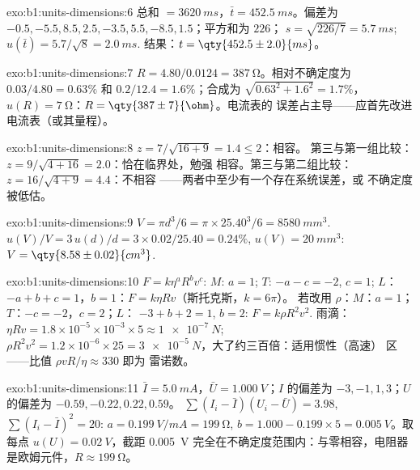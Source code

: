 \begin{solution}{exo:b1:units-dimensions:6}
总和 $= \qty{3620}{ms}$，$\bar t = \qty{452.5}{ms}$。偏差为
$-0.5, -5.5, 8.5, 2.5, -3.5, 5.5, -8.5, 1.5$；平方和为 $226$；
$s = \sqrt{226/7} = \qty{5.7}{ms}$; $u(\bar t) = 5.7/\sqrt8 = \qty{2.0}{ms}$.
结果：$t = \qty{452.5\pm2.0}{ms}$。
\end{solution}

\begin{solution}{exo:b1:units-dimensions:7}
$R = 4.80/0.0124 = \qty{387}{\ohm}$。相对不确定度为 $0.03/4.80 =
0.63\%$ 和 $0.2/12.4 = 1.6\%$；合成为 $\sqrt{0.63^2 + 1.6^2} = 1.7\%$，
$u(R) = \qty{7}{\ohm}$：$R = \qty{387\pm7}{\ohm}$。电流表的
误差占主导——应首先改进电流表（或其量程）。
\end{solution}

\begin{solution}{exo:b1:units-dimensions:8}
$z = 7/\sqrt{16 + 9} = 1.4 \leq 2$：相容。
第三与第一组比较：$z = 9/\sqrt{4 + 16} = 2.0$：恰在临界处，勉强
相容。第三与第二组比较：$z = 16/\sqrt{4 + 9} = 4.4$：不相容
——两者中至少有一个存在系统误差，或
不确定度被低估。
\end{solution}

\begin{solution}{exo:b1:units-dimensions:9}
$V = \pi d^3/6 = \pi \times 25.40^3/6 = \qty{8580}{mm^3}$.
$u(V)/V = 3\,u(d)/d = 3 \times 0.02/25.40 = 0.24\%$,
$u(V) = \qty{20}{mm^3}$: $V = \qty{8.58\pm0.02}{cm^3}$.
\end{solution}

\begin{solution}{exo:b1:units-dimensions:10}
$F = k\eta^a R^b v^c$: $M$: $a = 1$; $T$: $-a - c = -2$, $c = 1$;
$L$：$-a + b + c = 1$，$b = 1$：$F = k\eta R v$（斯托克斯，$k = 6\pi$）。
若改用 $\rho$：$M$：$a = 1$；$T$：$-c = -2$，$c = 2$；$L$：
$-3 + b + 2 = 1$, $b = 2$: $F = k\rho R^2 v^2$.
雨滴：$\eta R v = 1.8\times10^{-5} \times 10^{-3} \times 5 \approx
\qty{1e-7}{N}$; $\rho R^2 v^2 = 1.2 \times 10^{-6} \times 25 =
\qty{3e-5}{N}$，大了约三百倍：适用惯性（高速）
区——比值 $\rho v R/\eta \approx 330$ 即为
雷诺数。
\end{solution}

\begin{solution}{exo:b1:units-dimensions:11}
$\bar I = \qty{5.0}{mA}$，$\bar U = \qty{1.000}{V}$；$I$ 的偏差为
$-3, -1, 1, 3$；$U$ 的偏差为 $-0.59, -0.22, 0.22, 0.59$。
$\sum (I_i - \bar I)(U_i - \bar U) = 3.98$, $\sum (I_i - \bar I)^2 = 20$:
$a = \qty{0.199}{V/mA} = \qty{199}{\ohm}$, $b = 1.000 - 0.199 \times 5 =
\qty{0.005}{V}$。取每点 $u(U) = \qty{0.02}{V}$，截距
\qty{0.005}{V} 完全在不确定度范围内：与零相容，电阻器
是欧姆元件，$R \approx \qty{199}{\ohm}$。
\end{solution}

